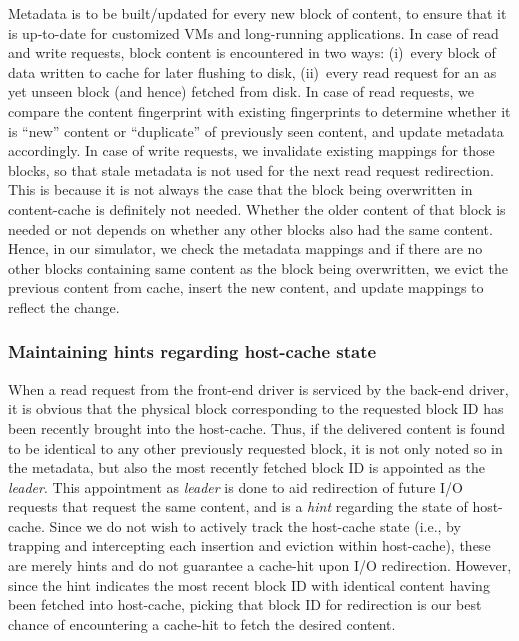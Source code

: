 Metadata is to be built/updated for every new block of content, to ensure that
it is up-to-date for customized VMs and long-running applications.
In case of read and write requests, block content is encountered in two ways:
(i)~every block of data written to cache for later flushing to disk,
(ii)~every read request for an as yet unseen block (and hence) fetched
from disk. 
In case of read requests, we compare the 
content fingerprint
with existing fingerprints to determine
whether it is ``new'' content or ``duplicate'' of previously seen content,
and update metadata accordingly.
In case of write requests, we invalidate existing mappings for those blocks,
so that stale metadata is not used for the next read request redirection.
This is because it is not always the case that the block being overwritten 
in content-cache is definitely not needed. Whether the older content of 
that block is needed or not depends on whether any other blocks also had 
the same content. Hence, in our simulator, we check the metadata mappings 
and if there are no other blocks containing same content as the block 
being overwritten, we evict the previous content from cache, insert the 
new content, and update mappings to reflect the change. 

\subsubsection{Maintaining hints regarding host-cache state}
When a read request from the front-end driver is serviced by the back-end
driver, it is obvious that the physical block
corresponding to the requested
block ID has been recently brought into the host-cache. Thus, if the delivered
content is found to be identical to any other previously requested block, it 
is not only noted 
so in the metadata, but also the most recently fetched block ID is appointed
as the \textit{leader}. This appointment as \textit{leader} is done to aid
redirection of future I/O requests that request the same content, and is
a \textit{hint} regarding the state of host-cache.
Since we do not wish to actively track the host-cache state (i.e., by
trapping and intercepting each insertion and eviction within host-cache), 
these are merely hints and do not guarantee a cache-hit upon I/O redirection.
However, since the hint indicates the most recent block ID with identical
content having been fetched into host-cache, picking that block ID for 
redirection is our best chance of encountering a cache-hit to fetch the 
desired content. 


